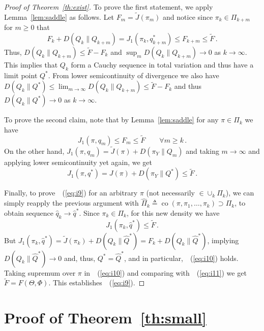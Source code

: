 \documentclass[12pt]{colt2021} %
\theoremstyle{remark}
\newcommand{\eqref}[1]{~(\ref{#1})}
\def\eqdef{\triangleq}
\newcommand{\co}{\mathop{\mathrm{co}}}
\renewcommand{\hat}{\widehat}
\renewcommand{\tilde}{\widetilde}
\begin{document}
\begin{proof}[Proof of Theorem~\ref{th:exist}]
			To prove the first statement, we apply Lemma~\ref{lem:saddle} as follows. Let $F_m = \tilde
			J(\pi_m)$ and notice since $\pi_k \in \Pi_{k+m}$ for $m\ge 0$ that
				$$ F_k + D(Q_k \|Q_{k+m}) = J_1(\pi_k, q_{k+m}^*) \le F_{k+m} \le \tilde F\,.$$
				Thus, $D(Q_k\|Q_{k+m})\le \tilde F - F_k$ and $\sup_m D(Q_k\|Q_{k+m}) \to 0$ as
				$k\to\infty$. 
				This implies that $Q_k$ form a Cauchy sequence in total variation and thus have a limit
				point $Q^*$. From lower semicontinuity of divergence we also have $D(Q_k\|Q^*) \le
				\lim_{m\to\infty} D(Q_k \|Q_{k+m}) \le \tilde F - F_k$ and thus $D(Q_k \|Q^*) \to 0$ as
				$k\to \infty$.

			To prove the second claim, note that by Lemma~\ref{lem:saddle} for any $\pi \in \Pi_k$ we have
				$$ J_1(\pi, q_m) \le F_m \le \tilde F \qquad \forall m\ge k\,.$$
				On the other hand, $J_1(\pi,q_m) = \tilde J(\pi) + D(\pi_Y\|Q_m)$ and taking
				$m\to\infty$ and applying lower semicontinuity yet again, we get
				\begin{equation}\label{eq:i10}
					J_1(\pi, q^*) =  J(\pi) + D(\pi_Y\|Q^*) \le \tilde F\,.
				\end{equation}				

			Finally, to prove~\eqref{eq:i9} for an arbitrary $\pi$ (not necessarily $\in \cup_k \Pi_k$), we
			can simply reapply the previous argument with $\widehat{\Pi}_k \eqdef \co(\pi, \pi_1,\ldots,\pi_k)
			\supset \Pi_k$, to obtain sequence $\hat q_k \to \hat q^*$. Since $\pi_k \in \Pi_k$, for this
			new density we have
				$$ J_1(\pi_k, \hat q^*) \le \tilde F\,.$$
			But $J_1(\pi_k,\hat q^*) = \tilde J(\pi_k) + D(Q_k \| \widehat{Q}^*) = F_k + D(Q_k \|
			\widehat{Q}^*)$, implying $D(Q_k \| \widehat{Q}^*) \to 0$ and, thus, $Q^* = \widehat{Q}^*$, and
			in particular,~\eqref{eq:i10} holds. Taking supremum over $\pi$ in~\eqref{eq:i10} and comparing
			with~\eqref{eq:i11} we get $\tilde F = F(\Theta,\Phi)$. This establishes~\eqref{eq:i9}.
	\end{proof}

\section{Proof of Theorem~\ref{th:small}}\label{sec:small}
\end{document}
